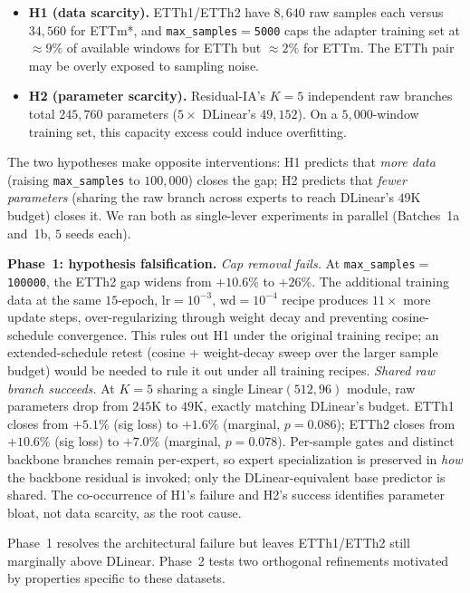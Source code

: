 \documentclass{article}
\begin{document}
\begin{itemize}
\item \textbf{H1 (data scarcity).} ETTh1/ETTh2 have $8{,}640$ raw samples each versus $34{,}560$ for ETTm*, and \texttt{max\_samples$=$5000} caps the adapter training set at $\approx 9\%$ of available windows for ETTh but $\approx 2\%$ for ETTm. The ETTh pair may be overly exposed to sampling noise.
\item \textbf{H2 (parameter scarcity).} Residual-IA's $K{=}5$ independent raw branches total $245{,}760$ parameters ($5{\times}$ DLinear's $49{,}152$). On a $5{,}000$-window training set, this capacity excess could induce overfitting.
\end{itemize}

The two hypotheses make opposite interventions: H1 predicts that \emph{more data} (raising \texttt{max\_samples} to $100{,}000$) closes the gap; H2 predicts that \emph{fewer parameters} (sharing the raw branch across experts to reach DLinear's $49$K budget) closes it. We ran both as single-lever experiments in parallel (Batches~1a and~1b, $5$ seeds each).

\textbf{Phase~1: hypothesis falsification.}
\emph{Cap removal fails.} At \texttt{max\_samples$=$100000}, the ETTh2 gap widens from $+10.6\%$ to $+26\%$. The additional training data at the same $15$-epoch, lr${=}10^{-3}$, wd${=}10^{-4}$ recipe produces $11{\times}$ more update steps, over-regularizing through weight decay and preventing cosine-schedule convergence. This rules out H1 under the original training recipe; an extended-schedule retest (cosine + weight-decay sweep over the larger sample budget) would be needed to rule it out under all training recipes.
\emph{Shared raw branch succeeds.} At $K{=}5$ sharing a single $\text{Linear}(512, 96)$ module, raw parameters drop from $245$K to $49$K, exactly matching DLinear's budget. ETTh1 closes from $+5.1\%$ (sig loss) to $+1.6\%$ (marginal, $p{=}0.086$); ETTh2 closes from $+10.6\%$ (sig loss) to $+7.0\%$ (marginal, $p{=}0.078$). Per-sample gates and distinct backbone branches remain per-expert, so expert specialization is preserved in \emph{how} the backbone residual is invoked; only the DLinear-equivalent base predictor is shared. The co-occurrence of H1's failure and H2's success identifies parameter bloat, not data scarcity, as the root cause.

Phase~1 resolves the architectural failure but leaves ETTh1/ETTh2 still marginally above DLinear. Phase~2 tests two orthogonal refinements motivated by properties specific to these datasets.
\end{document}
